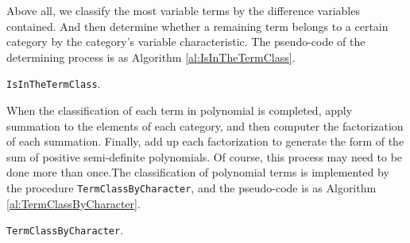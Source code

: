 \documentclass[10pt,a4paper]{article}
\begin{document}
Above all, we classify the most variable terms by the difference variables contained. And then determine whether a remaining term belongs to a certain category by the category's variable characteristic. The pseudo-code of the determining process is as Algorithm \ref{al:IsInTheTermClass}.
\begin{algorithm}[!ht]
  \caption{\texttt{IsInTheTermClass}.}\label{al:IsInTheTermClass}
\end{algorithm}

When the classification of each term in polynomial is completed, apply summation to the elements of each category, and then computer the factorization of each summation. Finally, add up each factorization to generate the form of the sum of positive semi-definite polynomials. Of course, this process may need to be done more than once.The classification of polynomial terms is implemented by the procedure \texttt{TermClassByCharacter}, and the pseudo-code is as Algorithm \ref{al:TermClassByCharacter}.
\begin{algorithm}[!ht]
  \caption{\texttt{TermClassByCharacter}.\label{al:TermClassByCharacter}}
\end{algorithm}
\end{document}
